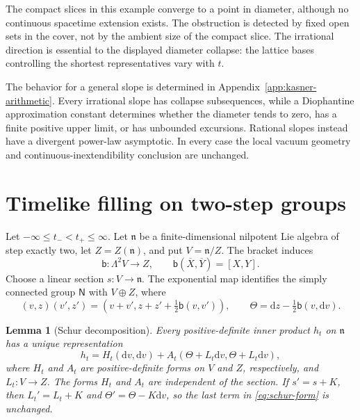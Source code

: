 \documentclass[10pt,a4paper]{article}
\numberwithin{equation}{section}
\newtheorem{lemma}[theorem]{Lemma}
\theoremstyle{definition}
\theoremstyle{remark}
\newcommand{\dd}{\mathrm d}
\begin{document}
The compact slices in this example converge to a point in diameter,
although no continuous spacetime extension exists.  The obstruction is
detected by fixed open sets in the cover, not by the ambient size of the
compact slice.  The irrational direction is essential to the displayed
diameter collapse: the lattice bases controlling the shortest
representatives vary with $t$.

The behavior for a general slope is determined in
Appendix~\ref{app:kasner-arithmetic}.  Every irrational slope has collapse
subsequences, while a Diophantine approximation constant determines whether
the diameter tends to zero, has a finite positive upper limit, or has
unbounded excursions.  Rational slopes instead have a divergent
power-law asymptotic.  In every case the local vacuum geometry and
continuous-inextendibility conclusion are unchanged.

\section{Timelike filling on two-step groups}
\label{sec:two-step}

Let $-\infty\le t_-<t_+\le\infty$.  Let $\mathfrak n$ be a finite-dimensional
nilpotent Lie algebra of step exactly two, let $Z=Z(\mathfrak n)$, and put
$V=\mathfrak n/Z$.  The bracket induces
\begin{equation}
 \mathsf b:\Lambda^2V\longrightarrow Z,
 \qquad \mathsf b(\overline X,\overline Y)=[X,Y].
 \label{eq:quotient-bracket}
\end{equation}
Choose a linear section $s:V\to\mathfrak n$.  The exponential map identifies
the simply connected group $\mathsf N$ with $V\oplus Z$, where
\begin{equation}
 (v,z)(v',z')=(v+v',z+z'+\tfrac12\mathsf b(v,v')),
 \qquad \Theta=\dd z-\tfrac12\mathsf b(v,\dd v).
 \label{eq:group-law}
\end{equation}

\begin{lemma}[Schur decomposition]
\label{lem:schur}
Every positive-definite inner product $h_t$ on $\mathfrak n$ has a unique
representation
\begin{equation}
 h_t=H_t(\dd v,\dd v)+
 A_t(\Theta+L_t\dd v,\Theta+L_t\dd v),
 \label{eq:schur-form}
\end{equation}
where $H_t$ and $A_t$ are positive-definite forms on $V$ and $Z$,
respectively, and $L_t:V\to Z$.  The forms $H_t$ and $A_t$ are independent
of the section.  If $s'=s+K$, then
$L_t'=L_t+K$ and $\Theta'=\Theta-K\dd v$, so the last term in
\eqref{eq:schur-form} is unchanged.
\end{lemma}
\end{document}
